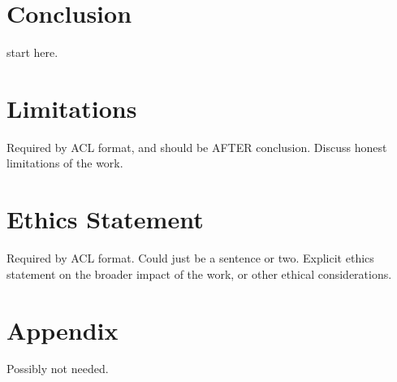 \documentclass[11pt]{article}
\begin{document}
\section{Conclusion}
start here.

\section*{Limitations}
Required by ACL format, and should be AFTER conclusion.
Discuss honest limitations of the work.

\section*{Ethics Statement}
Required by ACL format. Could just be a sentence or two.
Explicit ethics statement on the broader impact of the work, or other ethical considerations.




\appendix

\section{Appendix}
Possibly not needed.
\end{document}

